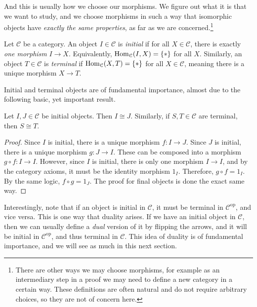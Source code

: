 And this is usually how we choose our morphisms. We figure out what it is that we want to study, and we choose morphisms in such a way that isomorphic objects have \emph{exactly the same properties}, as far as we are concerned.\footnote{There are other ways we may choose morphisms, for example as an intermediary step in a proof we may need to define a new category in a certain way. These definitions are often natural and do not require arbitrary choices, so they are not of concern here.}

\begin{definition}\label{dfn:6}
	Let $\mathcal{C} $ be a category. An object $I\in \mathcal{C} $ is \emph{initial} if for all $X\in \mathcal{C} $, there is exactly \emph{one morphism} $I\to X$. Equivalently, $\operatorname{Hom}_{\mathcal{C} }(I, X) =\left\{ * \right\} $ for all $X$. Similarly, an object $T\in \mathcal{C} $ is \emph{terminal} if $\operatorname{Hom}_{\mathcal{C} }(X, T) =\left\{ * \right\} $ for all $X\in \mathcal{C} $, meaning there is a unique morphism $X\to T$.
\end{definition}

Initial and terminal objects are of fundamental importance, almost due to the following basic, yet important result.

\begin{proposition}\label{prp:2}
	Let $I,J\in \mathcal{C} $ be initial objects. Then $I\cong J$. Similarly, if $S,T\in \mathcal{C} $ are terminal, then $S\cong T$.
\end{proposition}
\begin{proof}
	Since $I$ is initial, there is a unique morphism $f : I \to J$. Since $J$ is initial, there is a unique morphism $g : J \to I$. These can be composed into a morphism $g\circ f : I \to I$. However, since $I$ is initial, there is only one morphism $I\to I$, and by the category axioms, it must be the identity morphism $1_I$. Therefore, $g\circ f=1_I$. By the same logic, $f\circ g=1_J$. The proof for final objects is done the exact same way.
\end{proof}

Interestingly, note that if an object is initial in $\mathcal{C} $, it must be terminal in $\mathcal{C} ^{\mathrm{op} } $, and vice versa. This is one way that duality arises. If we have an initial object in $\mathcal{C} $, then we can usually define a \emph{dual} version of it by flipping the arrows, and it will be initial in $\mathcal{C} ^{\mathrm{op} } $, and thus terminal in $\mathcal{C} $. This idea of duality is of fundamental importance, and we will see as much in this next section.

